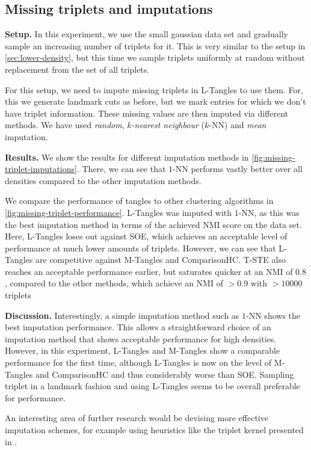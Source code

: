 \subsection{Missing triplets and imputations}\label{sec:imputation}
\textbf{Setup.}
In this experiment, we use the small gaussian data set and gradually sample an increasing number of triplets for it. 
This is very similar to the setup in \autoref{sec:lower-density}, but this time we sample triplets uniformly at random without replacement
from the set of all triplets. 

For this setup, we need to impute missing triplets in L-Tangles to use them. For, this we generate landmark cuts as before,
but we mark entries for which we don't have triplet information. These missing values are then imputed via different methods.
We have used \textit{random}, \textit{$k$-nearest neighbour }($k$-NN) and \textit{mean} imputation. 

\textbf{Results.}
We show the results for different imputation methods in \autoref{fig:missing-triplet-imputations}. 
There, we can see that $1$-NN performs vastly better over all densities compared to the other imputation methods.

We compare the performance of tangles to other clustering algorithms in \autoref{fig:missing-triplet-performance}. L-Tangles was imputed with $1$-NN, as this
was the best imputation method in terms of the achieved NMI score on the data set. 
Here, L-Tangles loses out against SOE, which achieves an acceptable level of performance at much lower amounts of triplets. 
However, we can see that L-Tangles are competitive against M-Tangles and ComparisonHC. T-STE also reaches an acceptable performance earlier, but saturates quicker at an NMI of $0.8$, compared to the other methods, which achieve an NMI of $>0.9$ with $>10000$ triplets

\textbf{Discussion.}
Interestingly, a simple imputation method such as $1$-NN shows the best imputation performance. This allows a straightforward choice of an imputation method that shows acceptable
performance for high densities. However, in this experiment, L-Tangles and M-Tangles show a comparable performance for the first time, although L-Tangles is now on the level of M-Tangles 
and ComparisonHC and thus considerably worse than SOE. Sampling triplet in a landmark fashion and using L-Tangles seems to be overall preferable for performance.

An interesting area of further research would be devising more effective imputation schemes, for example using heuristics like the
triplet kernel presented in \cite{kleindessnerKernelFunctionsBased2017}.

